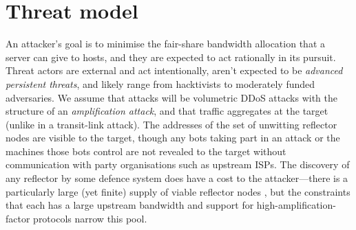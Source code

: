 %

\section{Threat model}\label{sec:ddos-threat}
An attacker's goal is to minimise the fair-share bandwidth allocation that a server can give to hosts, and they are expected to act rationally in its pursuit.
Threat actors are external and act intentionally, aren't expected to be 
\emph{advanced persistent threats}, and likely range from hacktivists to moderately funded adversaries.
We assume that attacks will be volumetric DDoS attacks with the structure of an \emph{amplification attack}, and that traffic aggregates at the target (unlike in a transit-link attack).
The addresses of the set of unwitting reflector nodes are visible to the target, though any bots taking part in an attack or the machines those bots control are not revealed to the target without communication with  party organisations such as upstream ISPs.
The discovery of any reflector by some defence system does have a cost to the attacker---there is a particularly large (yet finite) supply of viable reflector nodes \cite{DBLP:conf/ndss/Rossow14}, but the constraints that each has a large upstream bandwidth and support for high-amplification-factor protocols narrow this pool.

